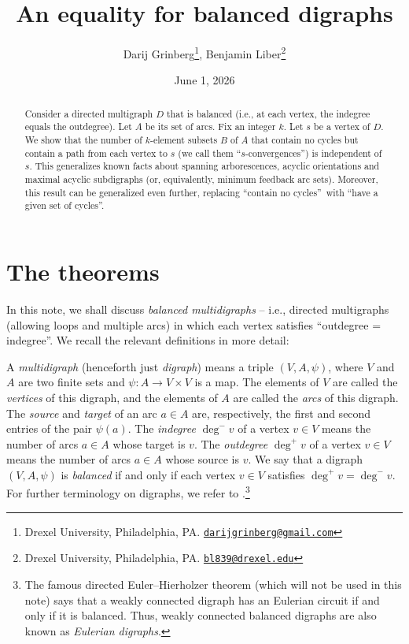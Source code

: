 \documentclass[numbers=enddot,12pt,final,onecolumn,notitlepage]{scrartcl}%
\theoremstyle{definition}
\theoremstyle{plainsl}
\begin{document}
\title{An equality for balanced digraphs}
\author{Darij Grinberg\thanks{Drexel University, Philadelphia, PA.
\href{mailto:darijgrinberg@gmail.com}{\texttt{darijgrinberg@gmail.com}}},
Benjamin Liber\thanks{Drexel University, Philadelphia, PA.
\href{mailto:bl839@drexel.edu}{\texttt{bl839@drexel.edu}}}}
\date{June 1, 2026}
\maketitle

\begin{abstract}
Consider a directed multigraph $D$ that is balanced (i.e., at each vertex, the
indegree equals the outdegree). Let $A$ be its set of arcs. Fix an integer
$k$. Let $s$ be a vertex of $D$. We show that the number of $k$-element
subsets $B$ of $A$ that contain no cycles but contain a path from each vertex
to $s$ (we call them \textquotedblleft$s$-convergences\textquotedblright) is
independent of $s$. This generalizes known facts about spanning arborescences,
acyclic orientations and maximal acyclic subdigraphs (or, equivalently,
minimum feedback arc sets). Moreover, this result can be generalized even
further, replacing \textquotedblleft contain no cycles\textquotedblright\ with
\textquotedblleft have a given set of cycles\textquotedblright.

\end{abstract}

\section{The theorems}

In this note, we shall discuss \emph{balanced multidigraphs} -- i.e., directed
multigraphs (allowing loops and multiple arcs) in which each vertex satisfies
\textquotedblleft outdegree = indegree\textquotedblright. We recall the
relevant definitions in more detail:

A \emph{multidigraph} (henceforth just \emph{digraph}) means a triple
$(V,A,\psi)$, where $V$ and $A$ are two finite sets and $\psi:A\rightarrow
V\times V$ is a map. The elements of $V$ are called the \emph{vertices} of
this digraph, and the elements of $A$ are called the \emph{arcs} of this
digraph. The \emph{source} and \emph{target} of an arc $a\in A$ are,
respectively, the first and second entries of the pair $\psi(a)$. The
\emph{indegree} $\deg^{-}v$ of a vertex $v\in V$ means the number of arcs
$a\in A$ whose target is $v$. The \emph{outdegree} $\deg^{+}v$ of a vertex
$v\in V$ means the number of arcs $a\in A$ whose source is $v$. We say that a
digraph $(V,A,\psi)$ is \emph{balanced} if and only if each vertex $v\in V$
satisfies $\deg^{+}v=\deg^{-}v$. For further terminology on digraphs, we refer
to \cite{22s}.\footnote{The famous directed Euler--Hierholzer theorem (which
will not be used in this note) says that a weakly connected digraph has an
Eulerian circuit if and only if it is balanced. Thus, weakly connected
balanced digraphs are also known as \emph{Eulerian digraphs}.}
\end{document}
